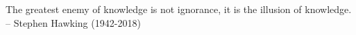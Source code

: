 \thispagestyle{empty}
{}

\vspace*{3cm}

\begin{center}
    The greatest enemy of knowledge is not ignorance, it is the illusion of knowledge. \\ \medskip
    -- Stephen Hawking (1942-2018)
\end{center}
